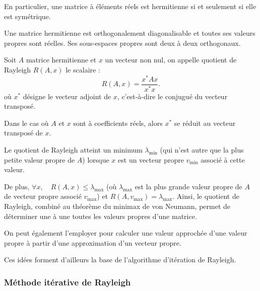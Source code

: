 En particulier, une matrice à éléments réels est hermitienne si et seulement si elle est symétrique. 

\medskip
Une matrice hermitienne est orthogonalement diagonalisable et toutes ses valeurs propres sont 
réelles. Ses sous-espaces propres sont deux à deux orthogonaux.

\medskip
\begin{definition}
Soit $A$ matrice hermitienne et $x$ un vecteur non nul, on appelle quotient de Rayleigh $R(A, x)$ le scalaire :
\begin{equation}
    R(A,x) = \frac{x^{*} A x}{x^{*} x}.
\end{equation}
où $x^{*}$ désigne le vecteur adjoint de $x$, c'est-à-dire le conjugué du vecteur transposé.
\end{definition}

Dans le cas où $A$ et $x$ sont à coefficients réels, alors $x^{*}$ se réduit au vecteur transposé de $x$.


\medskip
Le quotient de Rayleigh atteint un minimum $\lambda_{\text{min}}$ (qui n'est autre que la plus petite valeur propre de $A$) 
lorsque $x$ est un vecteur propre $v_{\text{min}}$ associé à cette valeur.

\medskip
De plus, $\forall x, \quad R(A, x) \leq \lambda_{\text{max}}$ (où $\lambda_{\text{max}}$ est la plus grande
valeur propre de $A$ de vecteur propre associé $v_{\text{max}}$) et $R(A, v_{\text{max}}) = \lambda_{\text{max}}$. 
Ainsi, le quotient de Rayleigh, combiné au théorème du minimax de von Neumann, 
permet de déterminer une à une toutes les valeurs propres d'une matrice. 

On peut également l'employer pour calculer une valeur approchée d'une valeur propre à partir d'une approximation 
d'un vecteur propre. 

Ces idées forment d'ailleurs la base de l’algorithme d’itération de Rayleigh.


\medskip
\subsubsection{Méthode itérative de Rayleigh}

